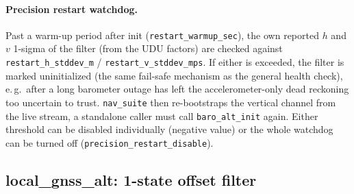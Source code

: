 \documentclass[11pt,a4paper]{article}
\newcommand{\code}[1]{\texttt{#1}}
\begin{document}
\paragraph{Precision restart watchdog.} Past a warm-up period after
init (\code{restart\_\allowbreak{}warmup\_\allowbreak{}sec}), the own reported $h$ and
$v$ 1-sigma of the filter (from the UDU factors) are checked against
\code{restart\_\allowbreak{}h\_\allowbreak{}stddev\_\allowbreak{}m} / \code{restart\_\allowbreak{}v\_\allowbreak{}stddev\_\allowbreak{}mps}. If either
is exceeded, the filter is marked uninitialized (the same fail-safe
mechanism as the general health check), e.\,g.\ after a long barometer
outage has left the accelerometer-only dead reckoning too uncertain to
trust. \code{nav\_\allowbreak{}suite} then re-bootstraps the vertical channel from
the live stream, a standalone caller must call \code{baro\_\allowbreak{}alt\_\allowbreak{}init}
again. Either threshold can be disabled individually (negative value)
or the whole watchdog can be turned off (\code{precision\_\allowbreak{}restart\_\allowbreak{}disable}).

\subsection{local\_gnss\_alt: 1-state offset filter}
\label{sec:offsetfilter}
\end{document}
